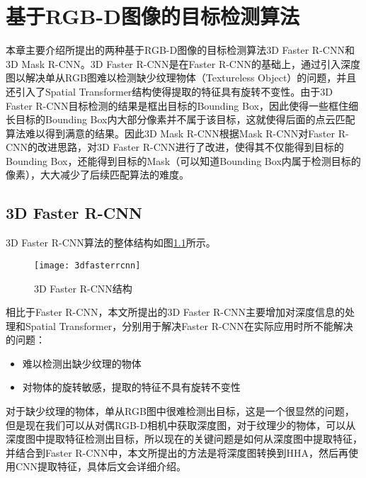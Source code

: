 \chapter{基于RGB-D图像的目标检测算法}
\label{chap:detector}
本章主要介绍所提出的两种基于RGB-D图像的目标检测算法3D Faster R-CNN和3D Mask R-CNN。3D Faster R-CNN是在Faster R-CNN\cite{Ren}的基础上，通过引入深度图以解决单从RGB图难以检测缺少纹理物体（Textureless Object）的问题，并且还引入了Spatial Transformer结构使得提取的特征具有旋转不变性。由于3D Faster R-CNN目标检测的结果是框出目标的Bounding Box，因此使得一些框住细长目标的Bounding Box内大部分像素并不属于该目标，这就使得后面的点云匹配算法难以得到满意的结果。因此3D Mask R-CNN根据Mask R-CNN\cite{He2017}对Faster R-CNN的改进思路，对3D Faster R-CNN进行了改进，使得其不仅能得到目标的Bounding Box，还能得到目标的Mask（可以知道Bounding Box内属于检测目标的像素），大大减少了后续匹配算法的难度。

\section{3D Faster R-CNN}
3D Faster R-CNN算法的整体结构如图\ref{fig:3d_faster_rcnn}所示。
\begin{figure}[ht]
  \centering
  \texttt{[image: 3dfasterrcnn]}
  \caption{3D Faster R-CNN结构}
  \label{fig:3d_faster_rcnn}
\end{figure}

相比于Faster R-CNN，本文所提出的3D Faster R-CNN主要增加对深度信息的处理和Spatial Transformer，分别用于解决Faster R-CNN在实际应用时所不能解决的问题：
\begin{itemize}
\item 难以检测出缺少纹理的物体
\item 对物体的旋转敏感，提取的特征不具有旋转不变性
\end{itemize}

对于缺少纹理的物体，单从RGB图中很难检测出目标，这是一个很显然的问题，但是现在我们可以从对偶RGB-D相机中获取深度图，对于纹理少的物体，可以从深度图中提取特征检测出目标，所以现在的关键问题是如何从深度图中提取特征，并结合到Faster R-CNN中，本文所提出的方法是将深度图转换到HHA，然后再使用CNN提取特征，具体后文会详细介绍。

